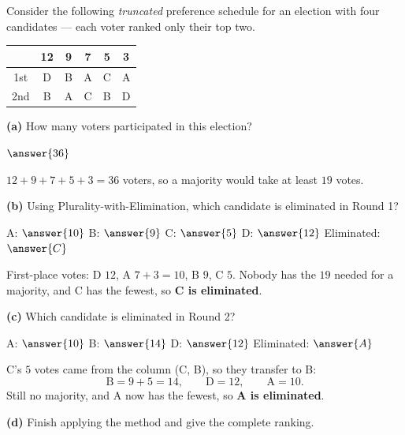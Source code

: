 \documentclass[12pt]{ximera}
\begin{document}
\begin{problem}
Consider the following \emph{truncated} preference schedule for an election with four
candidates --- each voter ranked only their top two.

\begin{center}
\begin{tabular}{c|ccccc}
 & 12 & 9 & 7 & 5 & 3\\\hline
1st & D & B & A & C & A \\
2nd & B & A & C & B & D \\
\end{tabular}
\end{center}

\begin{prompt}
\textbf{(a)} How many voters participated in this election?

$\answer{36}$

\begin{feedback}
$12+9+7+5+3=36$ voters, so a majority would take at least $19$ votes.
\end{feedback}
\end{prompt}

\begin{prompt}
\textbf{(b)} Using Plurality-with-Elimination, which candidate is eliminated in
Round 1?

A: $\answer{10}$ \quad B: $\answer{9}$ \quad C: $\answer{5}$ \quad D: $\answer{12}$
\qquad Eliminated: $\answer{C}$

\begin{feedback}
First-place votes: D $12$, A $7+3 = 10$, B $9$, C $5$. Nobody has the $19$ needed for a
majority, and C has the fewest, so \textbf{C is eliminated}.
\end{feedback}
\end{prompt}

\begin{prompt}
\textbf{(c)} Which candidate is eliminated in Round 2?

A: $\answer{10}$ \quad B: $\answer{14}$ \quad D: $\answer{12}$ \qquad
Eliminated: $\answer{A}$

\begin{feedback}
C's $5$ votes came from the column (C, B), so they transfer to B:
\[ \text{B} = 9+5 = 14, \qquad \text{D} = 12, \qquad \text{A} = 10. \]
Still no majority, and A now has the fewest, so \textbf{A is eliminated}.
\end{feedback}
\end{prompt}

\begin{prompt}
\textbf{(d)} Finish applying the method and give the complete ranking.


\end{prompt}
\end{problem}
\end{document}
